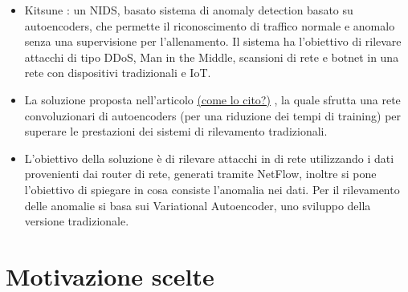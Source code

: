 \begin{itemize}
\item Kitsune \cite{kitsune}: un NIDS, basato sistema di anomaly detection basato su autoencoders, che permette il riconoscimento di traffico normale e anomalo senza una supervisione per l'allenamento. Il sistema ha l'obiettivo di rilevare attacchi di tipo DDoS, Man in the Middle, scansioni di rete e botnet in una rete con dispositivi tradizionali e IoT.
\item La soluzione proposta nell'articolo  \uline{(come lo cito?)} \cite{chen_autoencoders}, la quale sfrutta una rete convoluzionari di autoencoders (per una riduzione dei tempi di training) per superare le prestazioni dei sistemi di rilevamento tradizionali.
\item L'obiettivo della soluzione \cite{vae_autoencoders} è di rilevare attacchi in di rete utilizzando i dati provenienti dai router di rete, generati tramite NetFlow, inoltre si pone l'obiettivo di spiegare in cosa consiste l'anomalia nei dati. Per il rilevamento delle anomalie si basa sui Variational Autoencoder, uno sviluppo della versione tradizionale.

\end{itemize}

\section{Motivazione scelte}





